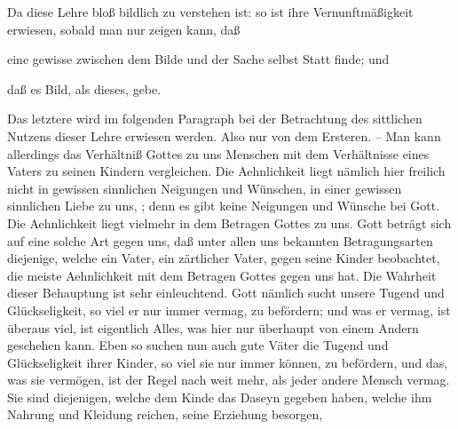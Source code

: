 \begin{aufza}
\item Da diese Lehre bloß bildlich zu verstehen ist: so ist ihre Vernunftmäßigkeit erwiesen, sobald man nur zeigen kann, daß
\begin{aufzb}
\item eine gewisse  zwischen dem Bilde und der Sache selbst Statt finde; und
\item daß es  Bild, als dieses, gebe.
\end{aufzb}
\item Das letztere wird im folgenden Paragraph bei der Betrachtung des sittlichen Nutzens dieser Lehre erwiesen werden. Also nur von dem Ersteren. -- Man kann allerdings das Verhältniß Gottes zu uns Menschen mit dem Verhältnisse eines Vaters zu seinen Kindern vergleichen. Die Aehnlichkeit liegt nämlich hier freilich nicht in gewissen sinnlichen Neigungen und Wünschen, in einer gewissen sinnlichen Liebe zu uns, \udgl ; denn es gibt keine Neigungen und Wünsche bei Gott. Die Aehnlichkeit liegt vielmehr in dem Betragen Gottes zu uns. Gott beträgt sich auf eine solche Art gegen uns, daß unter allen uns bekannten Betragungsarten diejenige, welche ein Vater, ein zärtlicher Vater, gegen seine Kinder beobachtet, die meiste Aehnlichkeit mit dem Betragen Gottes gegen uns hat. Die Wahrheit dieser Behauptung ist sehr einleuchtend. Gott nämlich sucht unsere Tugend und Glückseligkeit, so viel er nur immer vermag, zu befördern; und was er vermag, ist überaus viel, ist eigentlich Alles, was hier nur überhaupt von einem Andern geschehen kann. Eben so suchen nun auch gute Väter die Tugend und Glückseligkeit ihrer Kinder, so viel sie nur immer können, zu befördern, und das, was sie vermögen, ist der Regel nach weit mehr, als jeder andere Mensch vermag. Sie sind diejenigen, welche dem Kinde das Daseyn gegeben haben, welche ihm Nahrung und Kleidung reichen, seine Erziehung besorgen, \usw\
\end{aufza}

